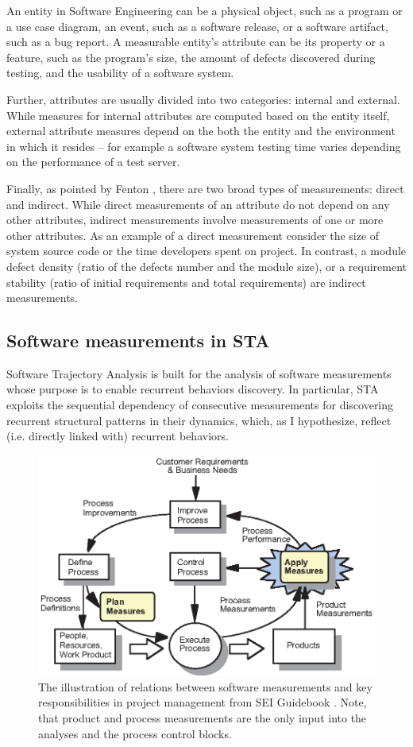 An entity in Software Engineering can be a physical object, such as a program or a use case diagram, 
an event, such as a software release, or a software artifact, such as a bug report.
A measurable entity's attribute can be its property or a feature, such as the program's size, the 
amount of defects discovered during testing, and the usability of a software system.

Further, attributes are usually divided into two categories: internal and external. 
While measures for internal attributes are computed based on the entity itself, external attribute 
measures depend on the both the entity and the environment in which it resides -- for example a 
software system testing time varies depending on the performance of a test server.

Finally, as pointed by Fenton \cite{citeulike:1803429}, there are two broad types of measurements: direct
and indirect. While direct measurements of an attribute do not depend on any other attributes, 
indirect measurements involve measurements of one or more other attributes. 
As an example of a direct measurement consider the size of system source code or the time developers spent 
on project. In contrast, a module defect density (ratio of the defects number and the module size), 
or a requirement stability (ratio of initial requirements and total requirements) are indirect measurements.

\subsection{Software measurements in STA}
Software Trajectory Analysis is built for the analysis of software measurements whose purpose is to enable 
recurrent behaviors discovery. In particular, STA exploits the sequential dependency of consecutive 
measurements for discovering recurrent structural patterns in their dynamics, which, as I hypothesize, 
reflect (i.e. directly linked with) recurrent behaviors.

\begin{figure}[t]
   \centering
   \includegraphics[width=115mm]{figures/SEI-measurements.eps}
   \caption{The illustration of relations between software measurements and key responsibilities 
   in project management from SEI Guidebook \cite{citeulike:10567306}. Note, that product and process 
   measurements are the only input into the analyses and the process control blocks.}
   \label{fig:sei-measures}
\end{figure}

